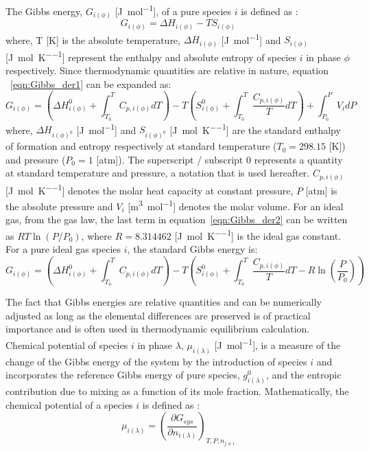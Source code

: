 	The Gibbs energy, $G_{i(\phi)}$ [\si{\joule \per \mole}], of a pure species  $i$ is defined as \cite{Zemansky81}:
	\begin{equation} \label{eqn:Gibbs_der1}
			G_{i(\phi)} = \Delta H_{i(\phi)} - TS_{i(\phi)}
	\end{equation}
	where, T [\si{\kelvin}] is the absolute temperature, $\Delta H_{i(\phi)}$ [\si{\joule \per \mole}] and $S_{i(\phi)}$ [\si{\joule \per \mole \per \kelvin}] represent the enthalpy and absolute entropy of species $i$ in phase $\phi$ respectively. Since thermodynamic quantities are relative in nature, equation ~\eqref{eqn:Gibbs_der1} can be expanded as:
	\begin{equation} \label{eqn:Gibbs_der2}
			G_{i(\phi)} = \left(\Delta H_{i(\phi)}^0 + \int_{T_0}^{T} C_{p,i(\phi)}dT \right) - T\left( S_{i(\phi)}^0  + \int_{T_0}^{T} \frac{C_{p,i(\phi)}}{T}dT \right) + \int_{P_0}^{P} V_i dP
	\end{equation}
	where, $\Delta H_{i(\phi)^0}$ [\si{\joule \per \mole}] and $S_{i(\phi)^0}$ [\si{\joule \per \mole \per \kelvin}] are the standard enthalpy of formation and entropy respectively at standard temperature ($T_0 = 298.15$ [\si{\kelvin}]) and pressure ($P_0 = 1$ [\si{atm}]). The superscript / subscript $0$ represents a quantity at standard temperature and pressure, a notation that is used hereafter. $C_{p,i(\phi)}$ [\si{\joule \per \mole \per \kelvin}]  denotes the molar heat capacity at constant pressure, $P$ [\si{atm}] is the absolute pressure and $V_i$ [\si{\meter \cubed \per \mole}] denotes the molar volume. For an ideal gas, from the gas law, the last term in equation~\eqref{eqn:Gibbs_der2} can be written as $RT \ln{\left(P/P_0\right)}$, where $R = 8.314462$ [\si{\joule \per \mole \per \kelvin}] is the ideal gas constant. For a pure ideal gas species $i$, the standard Gibbs energy is:
	\begin{equation} \label{eqn:Gibbs_der2}
			G_{i(\phi)} = \left(\Delta H_{i(\phi)}^0 + \int_{T_0}^{T} C_{p,i(\phi)}dT \right) - T\left( S_{i(\phi)}^0  + \int_{T_0}^{T} \frac{C_{p,i(\phi)}}{T}dT  - R \ln{\left(\frac{P}{P_0}\right)}\right)
	\end{equation}

	The fact that Gibbs energies are relative quantities and can be numerically adjusted as long as the elemental differences are preserved is of practical importance and is often used in thermodynamic equilibrium calculation. Chemical potential of species $i$ in phase $\lambda$, $\mu_{i(\lambda)}$ [\si{\joule \per \mole}], is a measure of the change of the Gibbs energy of the system by the introduction of species $i$ and incorporates  the reference Gibbs energy of pure species, $g_{i(\lambda)}^0$, and the entropic contribution due to mixing as a function of its mole fraction. Mathematically, the chemical potential of a species $i$ is defined as \cite{Zemansky81}:
    	\begin{equation}
        		\mu_{i(\lambda)} = {\left (\frac{\partial G_{sys}}{\partial n_{i(\lambda)}} \right )}_{T,P,n_{j \neq i}}
    	\end{equation}

